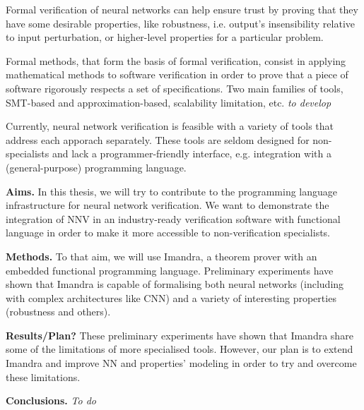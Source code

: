 \documentclass[]{article}
\begin{document}
Formal verification of neural networks can help ensure trust by proving that they have some desirable properties, like robustness, i.e. output's insensibility relative to input perturbation, or higher-level properties for a particular problem. 

Formal methods, that form the basis of formal verification, consist in applying mathematical methods to software verification in order to prove that a piece of software rigorously respects a set of specifications. Two main families of tools, SMT-based and approximation-based, scalability limitation, etc. \textit{to develop}

Currently, neural network verification is feasible with a variety of tools that address each apporach separately. These tools are seldom designed for non-specialists and lack a programmer-friendly interface, e.g. integration with a (general-purpose) programming language.

\textbf{Aims.} In this thesis, we will try to contribute to the programming language infrastructure for neural network verification. We want to demonstrate the integration of NNV in an industry-ready verification software with functional language in order to make it more accessible to non-verification specialists.

\textbf{Methods.} To that aim, we will use Imandra, a theorem prover with an embedded functional programming language. Preliminary experiments have shown that Imandra is capable of formalising both neural networks (including with complex architectures like CNN) and a variety of interesting properties (robustness and others).

\textbf{Results/Plan?} These preliminary experiments have shown that Imandra share some of the limitations of more specialised tools. However, our plan is to extend Imandra and improve NN and properties' modeling in order to try and overcome these limitations.

\textbf{Conclusions.} \textit{To do}
\end{document}
